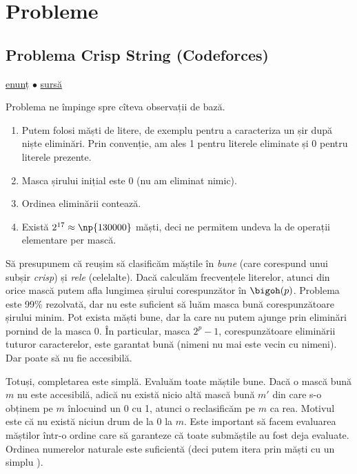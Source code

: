 \section{Probleme}

\subsection{Problema Crisp String (Codeforces)}
\label{problem:crisp-string}

\href{https://codeforces.com/contest/1117/problem/F}{enunț}
$\bullet$
\hyperref[code:crisp-string]{sursă}

Problema ne împinge spre cîteva observații de bază.

\begin{enumerate}
  \item Putem folosi măști de litere, de exemplu pentru a caracteriza un șir după niște eliminări. Prin convenție, am ales 1 pentru literele eliminate și 0 pentru literele prezente.

  \item Masca șirului inițial este 0 (nu am eliminat nimic).

  \item Ordinea eliminării contează.

  \item Există $2^{17} \approx \np{130000}$ măști, deci ne permitem undeva la  de operații elementare per mască.
\end{enumerate}

Să presupunem că reușim să clasificăm măștile în \textit{bune} (care corespund unui subșir \textit{crisp}) și \textit{rele} (celelalte). Dacă calculăm frecvențele literelor, atunci din orice mască putem afla lungimea șirului corespunzător în $\bigoh(p)$. Problema este 99\% rezolvată, dar nu este suficient să luăm masca bună corespunzătoare șirului minim. Pot exista măști bune, dar la care nu putem ajunge prin eliminări pornind de la masca 0. În particular, masca  $2^p - 1$, corespunzătoare eliminării tuturor caracterelor, este garantat bună (nimeni nu mai este vecin cu nimeni). Dar poate să nu fie accesibilă.

Totuși, completarea este simplă. Evaluăm toate măștile bune. Dacă o mască bună $m$ nu este accesibilă, adică nu există nicio altă mască bună $m'$ din care s-o obținem pe $m$ înlocuind un 0 cu 1, atunci o reclasificăm pe $m$ ca rea. Motivul este că nu există niciun drum de la 0 la $m$. Este important să facem evaluarea măștilor într-o ordine care să garanteze că toate submăștile au fost deja evaluate. Ordinea numerelor naturale este suficientă (deci putem itera prin măști cu un simplu ).


